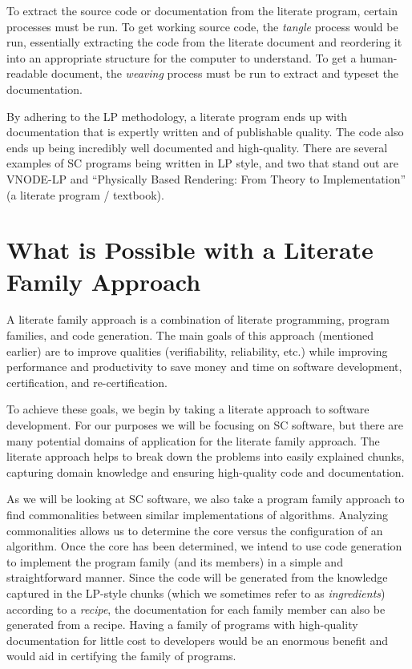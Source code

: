 \documentclass[10pt, preprint]{sigplanconf}
\begin{document}
To extract the source code or documentation from the literate program,
certain processes must be run. To get working source code, the \textit{tangle}
process would be run, essentially extracting the code from the literate document
and reordering it into an appropriate structure for the computer to
understand.  To get a human-readable document, the \textit{weaving}
process must be run to extract and typeset the documentation.

By adhering to the LP methodology, a literate program ends up with documentation
that is expertly written and of publishable quality. The code also ends up being
incredibly well documented and high-quality. There are several examples of SC
programs being written in LP style, and two that stand out are VNODE-LP
\cite{Nedialkov2006} and ``Physically Based Rendering: From Theory to
Implementation'' \cite{PharrAndHumphreys2004} (a literate program / textbook).

\section{What is Possible with a Literate Family Approach} \label{sec:what}

A literate family approach is a combination of literate programming, program
families, and code generation. The main goals of this approach (mentioned
earlier) are to improve qualities (verifiability, reliability, etc.) while
improving performance and productivity to save money and time on software
development, certification, and re-certification.

To achieve these goals, we begin by taking a literate approach to
software development. For our purposes we will be focusing on SC software, but
there are many potential domains of application for the literate family
approach. The literate approach helps to break down the problems into easily
explained chunks, capturing domain knowledge and ensuring high-quality code and
documentation.

As we will be looking at SC software, we also take a program family approach to
find commonalities between similar implementations of algorithms. Analyzing
commonalities allows us to determine the core versus the configuration of an
algorithm. Once the core has been determined, we intend to use code generation
to implement the program family (and its members) in a simple and
straightforward manner. Since the code will be generated from the knowledge
captured in the LP-style chunks (which we sometimes refer to as
\textit{ingredients}) according to a \textit{recipe}, the documentation for each
family member can also be generated from a
recipe. %
Having a family of programs with high-quality documentation for little cost to
developers would be an enormous benefit and would aid in certifying the family
of programs.
\end{document}
